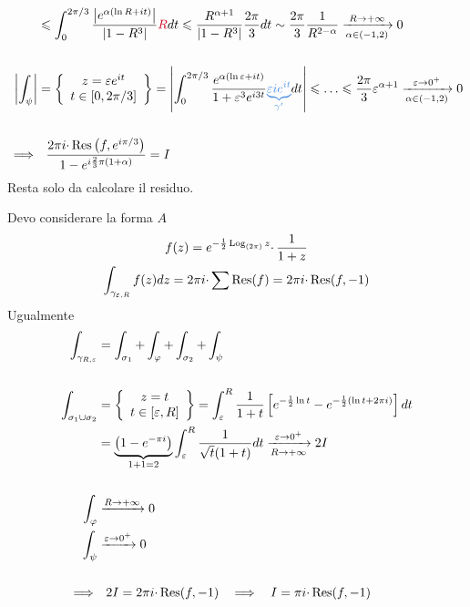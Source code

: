 \begin{equation*}
\begin{aligned}
 & \leqslant \int ^{2\pi /3}_{0}\frac{\left| e^{\alpha (\ln R+it)}\right| }{\left| 1-R^{3}\right| }\textcolor[rgb]{0.82,0.01,0.11}{R} dt\leqslant \frac{R^{\alpha +1}}{\left| 1-R^{3}\right| }\frac{2\pi }{3} dt\sim \frac{2\pi }{3}\frac{1}{R^{2-\alpha }}\xrightarrow[\alpha \in ( -1,2)]{R\rightarrow +\infty } 0\\
 & \\
\left| \int _{\psi }\right|  & =\left\{\begin{array}{ c }
z=\varepsilon e^{it}\\
t\in [ 0,2\pi /3]
\end{array}\right\} =\left| \int ^{2\pi /3}_{0}\frac{e^{\alpha (\ln \varepsilon +it)}}{1+\varepsilon ^{3} e^{i3t}}\textcolor[rgb]{0.29,0.56,0.89}{\underbrace{\varepsilon ie^{it}}_{\gamma '}} dt\right| \leqslant \dotsc \leqslant \frac{2\pi }{3} \varepsilon ^{\alpha +1}\xrightarrow[\alpha \in ( -1,2)]{\varepsilon \rightarrow 0^{+}} 0\\
 & \\
\implies  & \ \ \frac{2\pi i\cdotp \Res \left( f,e^{i\pi /3}\right)}{1-e^{i\frac{2}{3} \pi ( 1+\alpha )}} =I
\end{aligned}
\end{equation*}
Resta solo da calcolare il residuo.
\Soluzione

Devo considerare la forma $A$
\begin{gather*}
f( z) =e^{-\frac{1}{2}\operatorname{Log}_{( 2\pi )} z} \cdotp \frac{1}{1+z}\\
\int _{\gamma _{\varepsilon ,R}} f( z) dz=2\pi i\cdotp \sum \operatorname{Res} ( f) =2\pi i\cdotp \operatorname{Res} ( f,-1)
\end{gather*}
Ugualmente
\begin{equation*}
\begin{aligned}
\int _{\gamma _{R,\varepsilon }} & =\int _{\sigma _{1}} +\int _{\varphi } +\int _{\sigma _{2}} +\int _{\psi }\\
 & \\
\int _{\sigma _{1} \cup \sigma _{2}} & =\left\{\begin{array}{ c }
z=t\\
t\in [ \varepsilon ,R]
\end{array}\right\} =\int ^{R}_{\varepsilon }\frac{1}{1+t}\left[ e^{-\frac{1}{2}\ln t} -e^{-\frac{1}{2}(\ln t+2\pi i)}\right] dt\\
 & =\underbrace{\left( 1-e^{-\pi i}\right)}_{1+1=2}\int ^{R}_{\varepsilon }\frac{1}{\sqrt{t}( 1+t)} dt\xrightarrow[R\rightarrow +\infty ]{\varepsilon \rightarrow 0^{+}} 2I\\
 & \\
\int _{\varphi } & \xrightarrow{R\rightarrow +\infty } 0\\
\int _{\psi } & \xrightarrow{\varepsilon \rightarrow 0^{+}} 0\\
 & \\
\implies  & \ \ 2I=2\pi i\cdotp \operatorname{Res} ( f,-1) \ \ \implies \ \ I=\pi i\cdotp \operatorname{Res} ( f,-1)
\end{aligned}
\end{equation*}
\Soluzione

